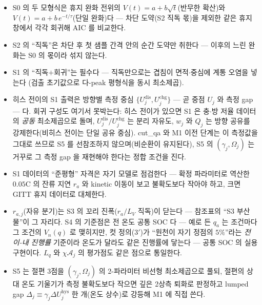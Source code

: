 \documentclass[11pt,a4paper]{article}
\newcommand{\dis}{\mathrm{dis}}
\newcommand{\chg}{\mathrm{chg}}
\newcommand{\hys}{\mathrm{hys}}
\begin{document}
\begin{itemize}[leftmargin=1.6em,itemsep=1pt]
\item S0 의 두 모형식은 휴지 완화 전위의 $V(t)=a+b\sqrt t$(반무한 확산)와
$V(t)=a+b\,e^{-t/\tau}$(단일 완화)다 — 차단 도약(S2 직독 몫)을 제외한 같은 휴지 창에서 각각
회귀해 AIC 를 비교한다.
\item S2 의 ``직독''은 차단 후 첫 샘플 간격 안의 순간 도약만 취한다 — 이후의 느린 완화는 S0 의
몫이라 섞지 않는다.
\item S1 의 ``직독$+$회귀''는 필수다 — 직독만으로는 겹침이 면적$\cdot$중심에 계통 오염을 넣는다
(검출 초기값으로 다-peak 평형식을 동시 최소제곱).
\item 히스 전이의 S1 출력은 방향별 측정 중심 $\{U_j^{\dis},U_j^{\chg}\}$ — 곧 중점 $U_j$ 와 측정
gap — 다. 회귀 구성도 여기서 못박는다: 히스 전이가 있으면 S1 은 충$\cdot$방 저율 데이터의
\emph{공동} 최소제곱으로 돌며, $U_j^{\dis}/U_j^{\chg}$ 는 분리 자유도, $w_j$ 와 $Q_j$ 는 방향
공유를 강제한다(비히스 전이는 단일 공유 중심). cut\_qa 와 M1 이전 단계는 이 측정값을 그대로 쓰므로 S5 를 선참조하지 않으며(비순환이
유지된다), S5 의 $(\gamma_j,\Omega_j)$ 는 거꾸로 그 측정 gap 을 재현해야 한다는 정합 조건을 진다.
\item S1 데이터의 ``준평형'' 자격은 자기 모델로 점검한다 — 확정 파라미터로 역산한 $0.05$C 의 잔류
지연 $r_a$ 와 kinetic 이동이 보고 불확도보다 작아야 하고, 크면 GITT 휴지 데이터로 대체한다.
\item $r_{a,j}$(자유 분기)는 S3 의 꼬리 진폭($r_a/L_V$ 직독)이 닫는다 — 참조표의 ``S3 부산물''이
그 자리다. S4 의 기준점은 전 온도 공통 SOC 다 — 예로 든 $q_a$ 는 조건마다 그 조건의 $V_n(q)$ 로
맺히지만, 컷 정의(3$'$)가 ``원천이 자기 정점의 $5\%$''라는 \emph{전이-내 진행률} 기준이라 온도가
달라도 같은 진행률에 닿는다 — 공통 SOC 의 실용 구현이다. $L_q$ 와 $\chi\mathcal A_j$ 의 평가점도
같은 점으로 통일한다.
\item S5 는 절편 3점을 $(\gamma_j,\Omega_j)$ 의 2-파라미터 비선형 최소제곱으로 풀되, 절편의 상대
온도 기울기가 측정 불확도보다 작으면 깊은 2상측 퇴화로 판정하고 lumped gap
$\Delta_j\equiv\gamma_j\Delta U_j^\hys$ 한 개(온도 상수)로 강등해 M1 에 직접 쓴다.
\end{itemize}
\end{document}

